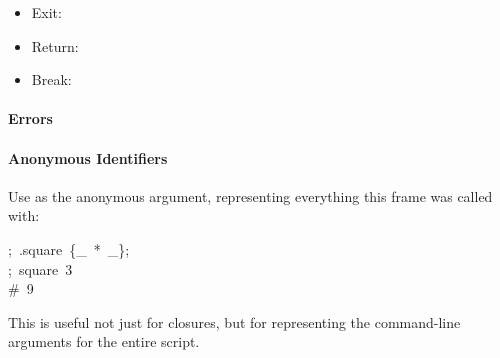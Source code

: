 \documentclass[preprint]{{acmart}}
\begin{document}
\begin{itemize}[noitemsep,topsep=\mdcompacttopsep]%

\item{}Exit: %

\item{}Return: %

\item{}Break: %
\end{itemize}%

\paragraph{Errors}\label{sec-errors}%

\noindent{}%

\paragraph{Anonymous Identifiers}\label{sec-anonymous-identifiers}%

\noindent{}Use \mdcode{\_} as the anonymous argument, representing everything this frame
was called with:%
\begin{mdpre}%
\noindent;~.square~\{\_~*~\_\};\\
;~square~3\\
{\#~9}%
\end{mdpre}\noindent{}This is useful not just for closures, but for representing the command-line
arguments for the entire script.
\end{document}
